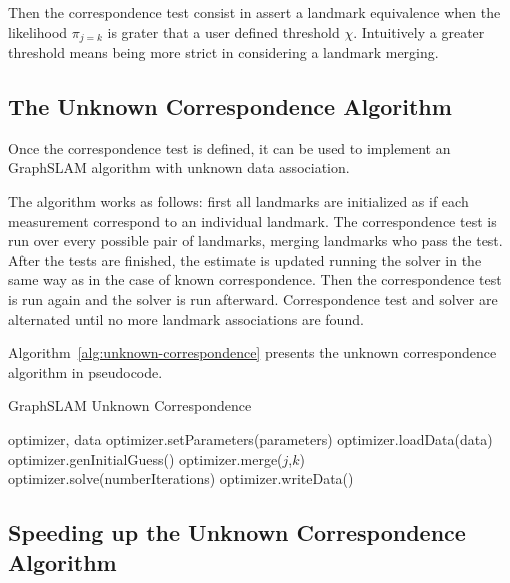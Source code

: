 Then the correspondence test consist in assert a landmark equivalence when the likelihood $\pi_{j=k}$ is grater that a user defined threshold $\chi$. Intuitively a greater threshold means being more strict in considering a landmark merging.

\subsection{The Unknown Correspondence Algorithm}

Once the correspondence test is defined, it can be used to implement an GraphSLAM algorithm with unknown data association. 

The algorithm works as follows: first all landmarks are initialized as if each measurement correspond to an individual landmark. The correspondence test is run over every possible pair of landmarks, merging landmarks who pass the test. After the tests are finished, the estimate is updated running the solver in the same way as in the case of known correspondence. Then the correspondence test is run again and the solver is run afterward. Correspondence test and solver are alternated until no more landmark associations are found. 

Algorithm~\ref{alg:unknown-correspondence} presents the unknown correspondence algorithm in pseudocode. 

\begin{algorithm}
    \caption{GraphSLAM Unknown Correspondence}
    \label{alg:unknown-correspondence}
    \begin{algorithmic}[1]
        \Require optimizer, data
        \State optimizer.setParameters(parameters)
        \State optimizer.loadData(data)
        \State optimizer.genInitialGuess()
        \State
                    \State optimizer.merge($j$,$k$) 
                \EndIf 
            \EndFor
            \State optimizer.solve(numberIterations)
        \EndWhile
        \State
        \State optimizer.writeData()
    \end{algorithmic}
\end{algorithm}

\subsection{Speeding up the Unknown Correspondence Algorithm}

